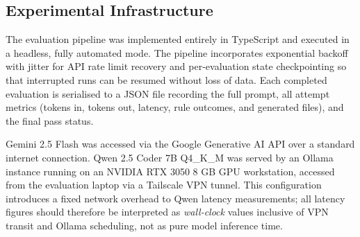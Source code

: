 \documentclass[review,12pt,3p]{elsarticle}
\begin{document}
\begin{table}[htbp]
\centering
\caption{Specifications and execution environment characteristics of the evaluated large language models (LLMs), ordered by parameter scale descending.}
\label{tab:models}
\end{table}

\subsection{Experimental Infrastructure}

The evaluation pipeline was implemented entirely in TypeScript and executed in a headless,
fully automated mode. The pipeline incorporates exponential backoff with jitter for API
rate limit recovery and per-evaluation state checkpointing so that interrupted runs can be
resumed without loss of data. Each completed evaluation is serialised to a JSON file
recording the full prompt, all attempt metrics (tokens in, tokens out, latency, rule
outcomes, and generated files), and the final pass status.

Gemini 2.5 Flash was accessed via the Google Generative AI API over a standard internet
connection. Qwen 2.5 Coder 7B Q4\_K\_M was served by an Ollama instance running on an
NVIDIA RTX 3050 8 GB GPU workstation, accessed from the evaluation laptop via a Tailscale
VPN tunnel. This configuration introduces a fixed network overhead to Qwen latency
measurements; all latency figures should therefore be interpreted as \emph{wall-clock}
values inclusive of VPN transit and Ollama scheduling, not as pure model inference time.
\end{document}
